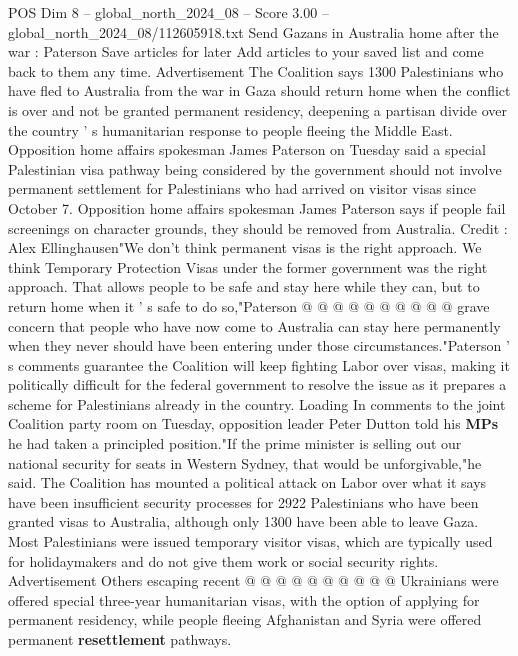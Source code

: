 \begin{textsample}{POS Dim 8 – global\_north\_2024\_08 – Score 3.00 – global\_north\_2024\_08/112605918.txt}  \label{ex:f8_pos_328}
Send Gazans in Australia home after the war : Paterson Save articles for later Add articles to your saved list and come back to them any time.
Advertisement The Coalition says 1300 Palestinians who have fled to Australia from the war in Gaza should return home when the conflict is over and not be granted permanent residency, deepening a partisan divide over the country ' s humanitarian response to people fleeing the Middle East.
Opposition home affairs spokesman James Paterson on Tuesday said a special Palestinian visa pathway being considered by the government should not involve permanent settlement for Palestinians who had arrived on visitor visas since October 7.
Opposition home affairs spokesman James Paterson says if people fail screenings on character grounds, they should be removed from Australia.
Credit : Alex Ellinghausen"We don't think permanent visas is the right approach.
We think Temporary Protection Visas under the former government was the right approach.
That allows people to be safe and stay here while they can, but to return home when it ' s safe to do so,"Paterson @ @ @ @ @ @ @ @ @ @ grave concern that people who have now come to Australia can stay here permanently when they never should have been entering under those circumstances."Paterson ' s comments guarantee the Coalition will keep fighting Labor over visas, making it politically difficult for the federal government to resolve the issue as it prepares a scheme for Palestinians already in the country.
Loading In comments to the joint Coalition party room on Tuesday, opposition leader Peter Dutton told his \textbf{MPs} he had taken a principled position."If the prime minister is selling out our national security for seats in Western Sydney, that would be unforgivable,"he said.
The Coalition has mounted a political attack on Labor over what it says have been insufficient security processes for 2922 Palestinians who have been granted visas to Australia, although only 1300 have been able to leave Gaza.
Most Palestinians were issued temporary visitor visas, which are typically used for holidaymakers and do not give them work or social security rights.
Advertisement Others escaping recent @ @ @ @ @ @ @ @ @ @ Ukrainians were offered special three-year humanitarian visas, with the option of applying for permanent residency, while people fleeing Afghanistan and Syria were offered permanent \textbf{resettlement} pathways.

\end{textsample}

